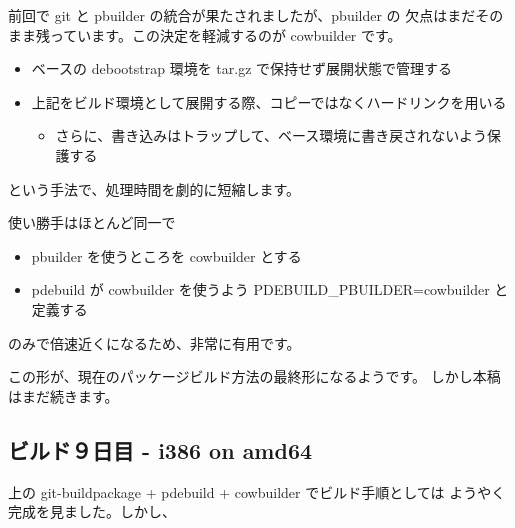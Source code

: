 \documentclass[mingoth,a4paper]{jsarticle}
\begin{document}
前回で git と pbuilder の統合が果たされましたが、pbuilder の
欠点はまだそのまま残っています。この決定を軽減するのが cowbuilder です。

\begin{itemize}
\item ベースの debootstrap 環境を tar.gz で保持せず展開状態で管理する
\item 上記をビルド環境として展開する際、コピーではなくハードリンクを用いる
\begin{itemize}
\item さらに、書き込みはトラップして、ベース環境に書き戻されないよう保護する
\end{itemize}
\end{itemize}

という手法で、処理時間を劇的に短縮します。


使い勝手はほとんど同一で

\begin{itemize}
\item pbuilder を使うところを cowbuilder とする
\item pdebuild が cowbuilder を使うよう PDEBUILD\_PBUILDER=cowbuilder と定義する
\end{itemize}

のみで倍速近くになるため、非常に有用です。

この形が、現在のパッケージビルド方法の最終形になるようです。
しかし本稿はまだ続きます。

\subsection{ビルド９日目 - i386 on amd64}

上の git-buildpackage + pdebuild + cowbuilder でビルド手順としては
ようやく完成を見ました。しかし、
\end{document}
